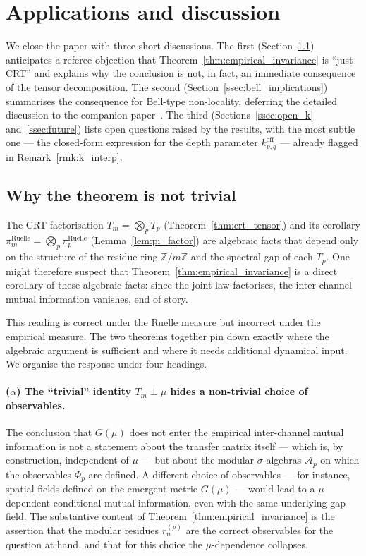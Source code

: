 \section{Applications and discussion}
\label{sec:applications}

We close the paper with three short discussions. The first
(Section~\ref{ssec:non_trivial}) anticipates a referee objection
that Theorem~\ref{thm:empirical_invariance} is ``just CRT'' and
explains why the conclusion is not, in fact, an immediate
consequence of the tensor decomposition. The second
(Section~\ref{ssec:bell_implications}) summarises the consequence
for Bell-type non-locality, deferring the detailed discussion to
the companion paper~\cite{PT_HOLONOMY_NONLOCALITY}. The third
(Sections~\ref{ssec:open_k} and~\ref{ssec:future}) lists open
questions raised by the results, with the most subtle one ---
the closed-form expression for the depth parameter
$k_{p,q}^{\mathrm{eff}}$ --- already flagged in
Remark~\ref{rmk:k_interp}.

\subsection{Why the theorem is not trivial}
\label{ssec:non_trivial}

The CRT factorisation $T_m = \bigotimes_p T_p$
(Theorem~\ref{thm:crt_tensor}) and its corollary
$\pi_m^{\mathrm{Ruelle}} = \bigotimes_p \pi_p^{\mathrm{Ruelle}}$
(Lemma~\ref{lem:pi_factor}) are algebraic facts that depend only
on the structure of the residue ring $\mathbb{Z}/m\mathbb{Z}$ and
the spectral gap of each $T_p$. One might therefore suspect that
Theorem~\ref{thm:empirical_invariance} is a direct corollary of
these algebraic facts: since the joint law factorises, the
inter-channel mutual information vanishes, end of story.

This reading is correct under the Ruelle measure but incorrect
under the empirical measure. The two theorems together pin down
exactly where the algebraic argument is sufficient and where it
needs additional dynamical input. We organise the response under
four headings.

\paragraph{($\alpha$) The ``trivial'' identity $T_m \perp \mu$
hides a non-trivial choice of observables.}
The conclusion that $G(\mu)$ does not enter the empirical
inter-channel mutual information is not a statement about the
transfer matrix itself --- which is, by construction, independent
of $\mu$ --- but about the modular $\sigma$-algebras
$\mathcal{A}_p$ on which the observables $\Phi_p$ are defined.
A different choice of observables --- for instance, spatial fields
defined on the emergent metric $G(\mu)$ --- would lead to a
$\mu$-dependent conditional mutual information, even with the same
underlying gap field. The substantive content of
Theorem~\ref{thm:empirical_invariance} is the assertion that the
modular residues $r_n^{(p)}$ are the correct observables for the
question at hand, and that for this choice the $\mu$-dependence
collapses.

